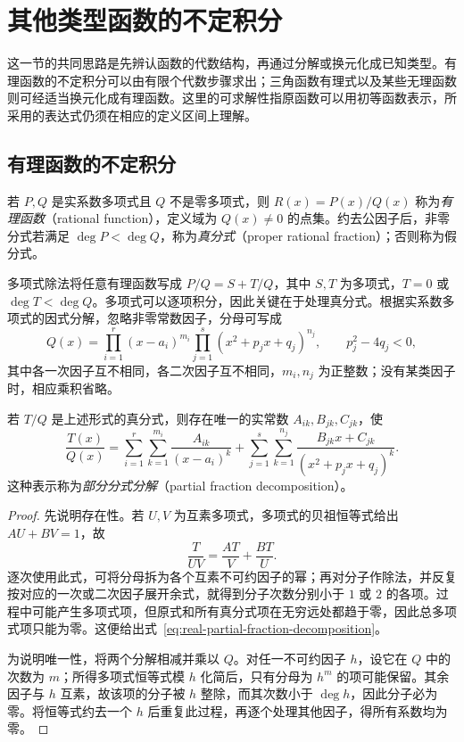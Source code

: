 \documentclass[UTF8,12pt,a4paper,fontset=fandol]{ctexbook}
\begin{document}
\section{其他类型函数的不定积分}
\label{sec:indefinite-integrals-of-other-functions}

这一节的共同思路是先辨认函数的代数结构，再通过分解或换元化成已知类型。有理函数的不定积分可以由有限个代数步骤求出；三角函数有理式以及某些无理函数则可经适当换元化成有理函数。这里的可求解性指原函数可以用初等函数表示，所采用的表达式仍须在相应的定义区间上理解。

\subsection{有理函数的不定积分}
\label{subsec:integrals-of-rational-functions}

\begin{definition}
\label{def:rational-function-and-proper-fraction}
若 $P,Q$ 是实系数多项式且 $Q$ 不是零多项式，则 $R(x)=P(x)/Q(x)$ 称为\emph{有理函数}（rational function），定义域为 $Q(x)\neq0$ 的点集。约去公因子后，非零分式若满足 $\deg P<\deg Q$，称为\emph{真分式}（proper rational fraction）；否则称为假分式。
\end{definition}

多项式除法将任意有理函数写成 $P/Q=S+T/Q$，其中 $S,T$ 为多项式，$T=0$ 或 $\deg T<\deg Q$。多项式可以逐项积分，因此关键在于处理真分式。根据实系数多项式的因式分解，忽略非零常数因子，分母可写成
\[
    Q(x)=\prod_{i=1}^r(x-a_i)^{m_i}
           \prod_{j=1}^s(x^2+p_jx+q_j)^{n_j},
    \qquad p_j^2-4q_j<0,
\]
其中各一次因子互不相同，各二次因子互不相同，$m_i,n_j$ 为正整数；没有某类因子时，相应乘积省略。

\begin{theorem}[部分分式分解]
\label{thm:real-partial-fraction-decomposition}
若 $T/Q$ 是上述形式的真分式，则存在唯一的实常数 $A_{ik},B_{jk},C_{jk}$，使
\begin{equation}
    \frac{T(x)}{Q(x)}
       =\sum_{i=1}^r\sum_{k=1}^{m_i}\frac{A_{ik}}{(x-a_i)^k}
        +\sum_{j=1}^s\sum_{k=1}^{n_j}
           \frac{B_{jk}x+C_{jk}}{(x^2+p_jx+q_j)^k}.
    \label{eq:real-partial-fraction-decomposition}
\end{equation}
这种表示称为\emph{部分分式分解}（partial fraction decomposition）。
\end{theorem}

\begin{proof}
先说明存在性。若 $U,V$ 为互素多项式，多项式的贝祖恒等式给出 $AU+BV=1$，故
\[
    \frac{T}{UV}=\frac{AT}{V}+\frac{BT}{U}.
\]
逐次使用此式，可将分母拆为各个互素不可约因子的幂；再对分子作除法，并反复按对应的一次或二次因子展开余式，就得到分子次数分别小于 $1$ 或 $2$ 的各项。过程中可能产生多项式项，但原式和所有真分式项在无穷远处都趋于零，因此总多项式项只能为零。这便给出式~\eqref{eq:real-partial-fraction-decomposition}。

为说明唯一性，将两个分解相减并乘以 $Q$。对任一不可约因子 $h$，设它在 $Q$ 中的次数为 $m$；所得多项式恒等式模 $h$ 化简后，只有分母为 $h^m$ 的项可能保留。其余因子与 $h$ 互素，故该项的分子被 $h$ 整除，而其次数小于 $\deg h$，因此分子必为零。将恒等式约去一个 $h$ 后重复此过程，再逐个处理其他因子，得所有系数均为零。
\end{proof}
\end{document}

